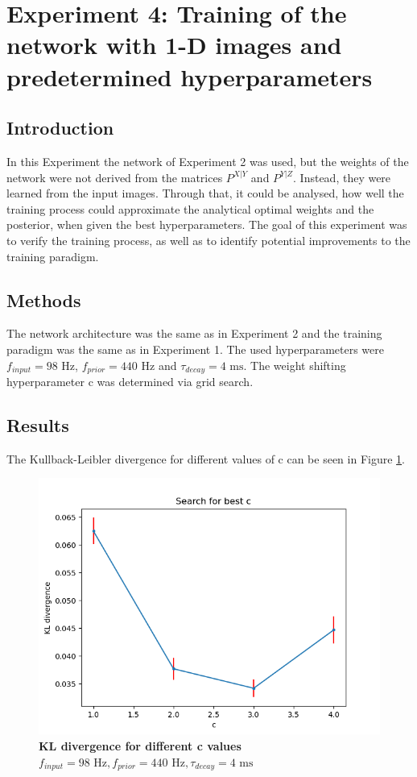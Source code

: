\section{Experiment 4: Training of the network with 1-D images and predetermined hyperparameters}
\label{section:1DPreDetermined}

\subsection{Introduction}

In this Experiment the network of Experiment 2 was used, but the weights of the network were not derived from the matrices $P^{X|Y}$ and $P^{Y|Z}$. Instead, they were learned from the input images. Through that, it could be analysed, how well the training process could approximate the analytical optimal weights and the posterior, when given the best hyperparameters. The goal of this experiment was to verify the training process, as well as to identify potential improvements to the training paradigm.

\subsection{Methods}

The network architecture was the same as in Experiment 2 and the training paradigm was the same as in Experiment 1. The used hyperparameters were $f_{input} = 98\text{ Hz}$, $f_{prior} = 440\text{ Hz}$ and $\tau_{decay} = 4\text{ ms}$. The weight shifting hyperparameter c was determined via grid search.
\subsection{Results}

The Kullback-Leibler divergence for different values of c can be seen in Figure \ref{fig:1DTrainingC}.
\begin{figure}
\centering
  \includegraphics[width=0.75\linewidth]{figures/1D/training/KLD_cvsfInput98_fPrior440tau4.png}
  \caption{\textbf{KL divergence for different c values} $f_{input} = 98\text{ Hz}, f_{prior} = 440\text{ Hz}, \tau_{decay} = 4\text{ ms}$}
  \label{fig:1DTrainingC}
\end{figure}

